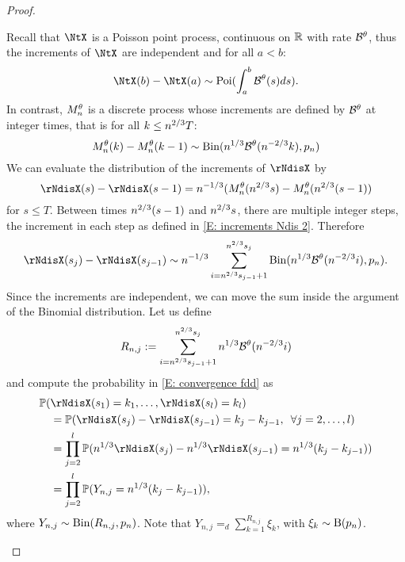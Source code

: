 \begin{proof}
\begin{proofpart}
Recall that $\NtX$ is a Poisson point process, continuous on $\mathbb{R}$ with rate $\mathcal{B}^{\theta}$,
thus the increments of $\NtX$ are independent and for all $a<b$: 
\begin{equation}
\NtX(b) - \NtX(a) \sim \Poisson( \int_{a}^{b} \BtX(s)ds).
\end{equation}
In contrast, $M_n^{\theta}$ is a discrete process whose increments are defined by $\mathcal{B}^{\theta}$ at integer times, 
that is for all $k \leq n^{2 / 3}T$: 
\begin{equation} \label{E: increments Ndis 2}
M_n^{\theta}(k) - M_n^{\theta}(k-1) \sim \operatorname*{Bin}(n^{1 / 3}\mathcal{B}^{\theta}(n^{-2 / 3}k), p_n)
\end{equation}
We can evaluate the distribution of the increments of $\rNdisX$ by
\begin{equation}
\rNdisX(s) - \rNdisX(s-1) = \n{-1}{3}( \Ndis(\n{2}{3}s) - \Ndis(\n{2}{3}(s-1))
\end{equation}
for $s \leq T$.
Between times $n^{2 / 3}(s-1)$ and $n^{2 / 3}s$, there are multiple integer steps,
the increment in each step as defined in \eqref{E: increments Ndis 2}. 
Therefore
\begin{equation}
\rNdisX(s_j) - \rNdisX(s_{j-1}) \sim \n{-1}{3} \sum_{i=\n{2}{3}s_{j-1}+1}^{\n{2}{3}s_j} \Binom( \n{1}{3}\BtX(\n{-2}{3}i), \p ).
\end{equation}
Since the increments are independent, we can move the sum inside the argument of the Binomial distribution.
Let us define 
\begin{equation*}
R_{n,j} := \sum_{i=n^{2 / 3}s_{j-1}+1}^{n^{2 / 3}s_j}n^{1 / 3}\mathcal{B}^{\theta}(n^{-2 / 3}i)
\end{equation*}
and compute the probability in \eqref{E: convergence fdd} as
\begin{equation} \label{E: distribution Ndis}
\begin{aligned}
&\Prob(\rNdisX(s_1) = k_1, \dots, \rNdisX(s_l) = k_l) \\
&\quad = \Prob( \rNdisX(s_j) - \rNdisX(s_{j-1}) = k_j - k_{j-1}, \enspace \forall j=2,\dots,l ) \\
&\quad = \prod_{j=2}^{l} \Prob( \n{1}{3}\rNdisX(s_j) - \n{1}{3}\rNdisX(s_{j-1}) = \n{1}{3}(k_j - k_{j-1})) \\
&\quad = \prod_{j=2}^{l} \Prob( Y_{n,j} = \n{1}{3}(k_j - k_{j-1}) ),
\end{aligned}
\end{equation}
where $Y_{n,j} \sim \operatorname*{Bin}(R_{n,j}, p_n)$.
Note that $Y_{n,j} =_d \sum_{k=1}^{R_{n,j}} \xi_k$, with $\xi_k \sim \operatorname*{B}(p_n)$.


\end{proofpart}
\end{proof}
